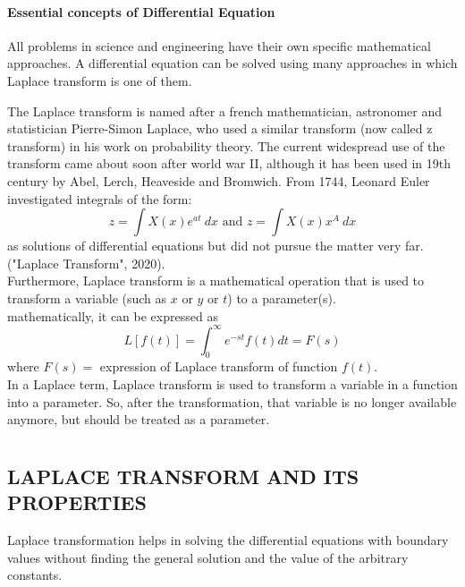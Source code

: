 \documentclass[12pt]{report}
\begin{document}
\subsubsection{Essential concepts of Differential Equation}
\qquad All problems in science and engineering have their own specific mathematical approaches. A differential equation can be solved using many approaches in which Laplace transform is one of them. \\

\par The Laplace transform is named after a french mathematician, astronomer and statistician Pierre-Simon Laplace, who used a similar transform (now called z transform) in his work on probability theory. The current widespread use of the transform came about soon after world war II, although it has been used in 19th century by Abel, Lerch, Heaveside and Bromwich. From 1744, Leonard Euler investigated integrals of the form:
\begin{equation}
z=\int X(x)e^{at}~dx \mbox{ and } z=\int X(x)x^A~dx
\end{equation}
as solutions of differential equations but did not pursue the matter very far. ("Laplace Transform", 2020).\\

Furthermore, Laplace transform is a mathematical operation that is used to transform a variable (such as $x \mbox{ or } y \mbox{ or } t$) to a parameter(s). \\
mathematically, it can be expressed as
\begin{equation}
L[f(t)]=\int_0^\infty e^{-st} f(t)dt=F(s)
\end{equation}
where $F(s)=$ expression of Laplace transform of function $f(t)$. \\
In a Laplace term, Laplace transform is used to transform a variable in a function into a parameter. So, after the transformation, that variable is no longer available anymore, but should be treated as a parameter.
\chapter{}
\section{LAPLACE TRANSFORM AND ITS PROPERTIES}
\par Laplace transformation helps in solving the differential equations with boundary values without finding the general solution and the value of the arbitrary constants.
\end{document}
